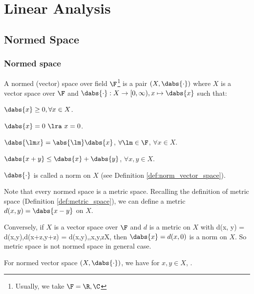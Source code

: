 \chapter{Linear Analysis}

\section{Normed Space}

\subsection{Normed space}

\begin{definition}\label{def:normed_space}
A normed (vector) space over field $\F$\footnote{Usually, we take $\F = \R,\C$} is a pair $(X,\dabs{\cdot})$ where $X$ is a vector space over $\F$ and $\dabs{\cdot} : X\to [0,\infty), x\mapsto \dabs{x}$ such
that:
\ben
\item [(i)] $\dabs{x}\geq 0,\forall x\in X$.
\item [(ii)] $\dabs{x} = 0 \ \lra\ x = 0$.
\item [(iii)] $\dabs{\lm x} = \abs{\lm}\dabs{x}$, $\forall \lm \in \F$, $\forall x\in X$.
\item [(iv)] $\dabs{x+y} \leq \dabs{x} + \dabs{y}$, $\forall x,y\in X$.
\een

$\dabs{\cdot}$ is called a norm on $X$ (see Definition \ref{def:norm_vector_space}).
\end{definition}



\begin{remark}\label{rem:normed_space_is_metric_space}
Note that every normed space is a metric space. Recalling the definition of metric space (Definition \ref{def:metric_space}), we can define a metric $d(x,y) = \dabs{x-y}$ on $X$.

Conversely, if $X$ is a vector space over $\F$ and $d$ is a metric on $X$ with
\be
d(\lm x, \lm y) = \abs{\lm} d(x,y),\qquad d(x+z,y+z) = d(x,y),\qquad \forall \lm \in \F,x,y,z\in X,
\ee
then $\dabs{x} = d(x,0)$ is a norm on $X$. So metric space is not normed space in general case.
\end{remark}


\begin{proposition}
For normed vector space $(X,\dabs{\cdot})$, we have for $x,y\in X$,
\be
{} \leq {}.
\ee
\end{proposition}

